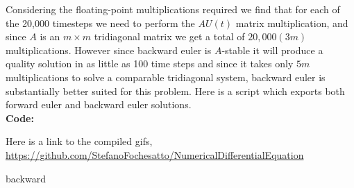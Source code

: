 \documentclass[12pt]{article}
\makeatletter
\theoremstyle{homework}
\newenvironment{exercise}[1]
{\def\@currentlabel{#1}\exercisecore}
{\endexercisecore}
\makeatother
\begin{document}
\begin{exercise}{Problem P33}
\begin{enumerate}
    Considering the floating-point multiplications required we find that for each of the 20,000 timesteps we need to 
    perform the $AU(t)$ matrix multiplication, and since $A$ is an $m \times m$ tridiagonal matrix we get a total of $20,000(3m)$ multiplications. 
    However since backward euler is $A$-stable it will produce a quality solution in as little as 100 time steps and
    since it takes only $5m$ multiplications to solve a comparable tridiagonal system, backward euler is substantially better suited for this problem. 
    \newpage
    Here is a script which exports both forward euler and backward euler solutions.\\
    \textbf{Code:}
    \begin{center}
      
    \end{center}
    Here is a link to the compiled gifs, \\
    \href{https://github.com/StefanoFochesatto/NumericalDifferentialEquation}{https://github.com/StefanoFochesatto/NumericalDifferentialEquation}

backward 


  \end{enumerate}


\end{exercise}
\end{document}
